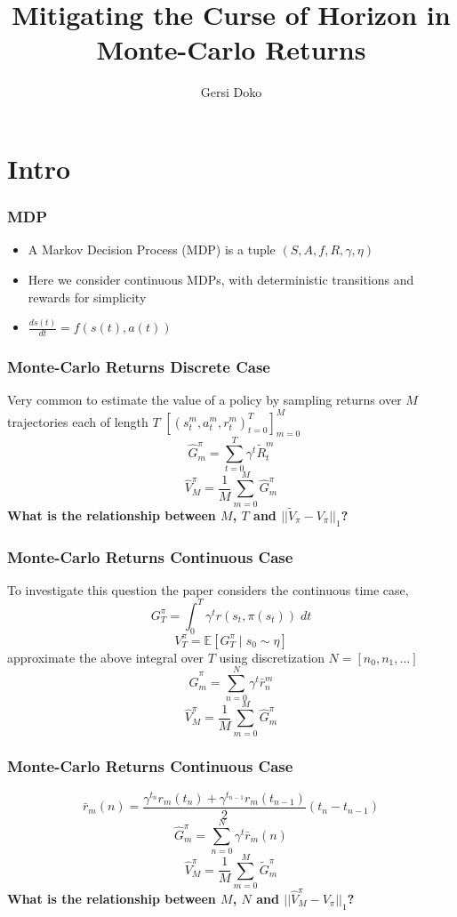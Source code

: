 \documentclass{beamer}
\title{Mitigating the Curse of Horizon in Monte-Carlo Returns}
\author{Gersi Doko}
\institute{Department of Computer Science \\ University of New Hampshire}
\date{}
\begin{document}
\frame{\titlepage}

\section*{Intro}

\begin{frame}
\frametitle{MDP}
\begin{itemize}
  \item A Markov Decision Process (MDP) is a tuple $(S, A, f, R, \gamma, \eta)$
  \vfill
  \item Here we consider continuous MDPs, with deterministic transitions and rewards for simplicity
  \vfill
  \item $\frac{ds(t)}{dt} = f(s(t), a(t))$
\end{itemize}
\end{frame}

\begin{frame}
\frametitle{Monte-Carlo Returns Discrete Case}
  Very common to estimate the value of a policy by sampling returns over $M$ trajectories each of length $T$
  $[(s^m_t, a^m_t, r^m_t)_{t=0}^{T}]_{m=0}^{M}$
  \vfill
  $$\hat{G}_m^\pi = \sum_{t=0}^{T} \gamma^t \tilde{R}^m_{t}$$
  $$\hat{V}_M^\pi = \frac{1}{M} \sum_{m=0}^{M} \hat{G}_m^\pi$$
  \vfill
  \textbf{What is the relationship between $M$, $T$ and $\lvert\lvert \tilde{V}_\pi - V_\pi \rvert\rvert_1$?}
\end{frame}

\begin{frame}
\frametitle{Monte-Carlo Returns Continuous Case}
To investigate this question the paper considers the continuous time case,
\vfill
  $$G_T^\pi = \int_{0}^{T} \gamma^t r(s_t, \pi(s_t)) \; dt$$
  $$V_T^\pi = \mathbb{E}[G^\pi_T \mid s_0 \sim \eta]$$
\vfill
approximate the above integral over $T$ using discretization $N=[n_0, n_1, \dots]$
  $$\hat{G}_m^\pi = \sum_{n=0}^{N} \gamma^t \bar{r}^m_{n}$$
  $$\hat{V}^\pi_M = \frac{1}{M} \sum_{m=0}^{M} \hat{G}_m^\pi$$
\end{frame}

\begin{frame}
\frametitle{Monte-Carlo Returns Continuous Case}
  $$\bar{r}_m(n) = \frac{\gamma^{t_n} r_m(t_n) + \gamma^{t_{n-1}} r_m(t_{n-1})}{2}(t_n - t_{n-1})$$
  $$\hat{G}_m^\pi = \sum_{n=0}^{N} \gamma^t \bar{r}_m(n)$$
  $$\hat{V}^\pi_M = \frac{1}{M} \sum_{m=0}^{M} \tilde{G}_m^\pi$$
  \textbf{What is the relationship between $M$, $N$ and $\lvert\lvert \hat{V}^\pi_M - V_\pi \rvert\rvert_1$?}
\end{frame}
\end{document}

